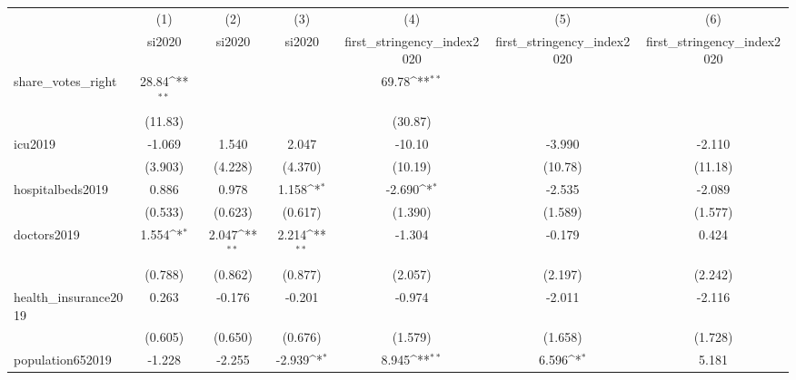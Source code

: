 {
\def\sym#1{\ifmmode^{#1}\else\(^{#1}\)\fi}
\begin{tabular}{l*{6}{c}}
\hline\hline
            &\multicolumn{1}{c}{(1)}&\multicolumn{1}{c}{(2)}&\multicolumn{1}{c}{(3)}&\multicolumn{1}{c}{(4)}&\multicolumn{1}{c}{(5)}&\multicolumn{1}{c}{(6)}\\
            &\multicolumn{1}{c}{si2020}&\multicolumn{1}{c}{si2020}&\multicolumn{1}{c}{si2020}&\multicolumn{1}{c}{first\_stringency\_index2020}&\multicolumn{1}{c}{first\_stringency\_index2020}&\multicolumn{1}{c}{first\_stringency\_index2020}\\
\hline
share\_votes\_right&       28.84\sym{**} &                     &                     &       69.78\sym{**} &                     &                     \\
            &     (11.83)         &                     &                     &     (30.87)         &                     &                     \\
[1em]
icu2019     &      -1.069         &       1.540         &       2.047         &      -10.10         &      -3.990         &      -2.110         \\
            &     (3.903)         &     (4.228)         &     (4.370)         &     (10.19)         &     (10.78)         &     (11.18)         \\
[1em]
hospitalbeds2019&       0.886         &       0.978         &       1.158\sym{*}  &      -2.690\sym{*}  &      -2.535         &      -2.089         \\
            &     (0.533)         &     (0.623)         &     (0.617)         &     (1.390)         &     (1.589)         &     (1.577)         \\
[1em]
doctors2019 &       1.554\sym{*}  &       2.047\sym{**} &       2.214\sym{**} &      -1.304         &      -0.179         &       0.424         \\
            &     (0.788)         &     (0.862)         &     (0.877)         &     (2.057)         &     (2.197)         &     (2.242)         \\
[1em]
health\_insurance2019&       0.263         &      -0.176         &      -0.201         &      -0.974         &      -2.011         &      -2.116         \\
            &     (0.605)         &     (0.650)         &     (0.676)         &     (1.579)         &     (1.658)         &     (1.728)         \\
[1em]
population652019&      -1.228         &      -2.255         &      -2.939\sym{*}  &       8.945\sym{**} &       6.596\sym{*}  &       5.181         \\

\end{tabular}}
